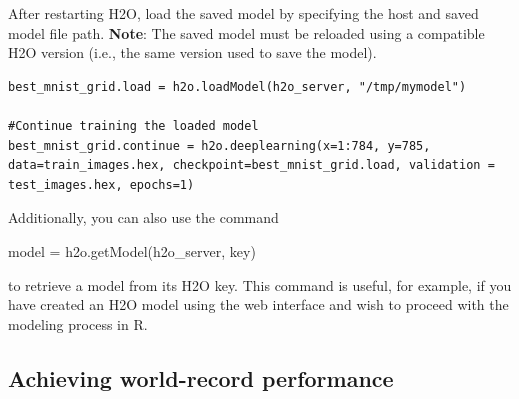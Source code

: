 \documentclass{article}[11pt]
\begin{document}
\noindent
After restarting  H2O, load the saved model by specifying the host and saved model file path. \textbf{Note}: The saved model must be reloaded using a compatible H2O version (i.e., the same version used to save the model).

\begin{lstlisting}[breaklines,basicstyle=\ttfamily]
best_mnist_grid.load = h2o.loadModel(h2o_server, "/tmp/mymodel")

#Continue training the loaded model
best_mnist_grid.continue = h2o.deeplearning(x=1:784, y=785, data=train_images.hex, checkpoint=best_mnist_grid.load, validation = test_images.hex, epochs=1)

\end{lstlisting}
\normalsize

\noindent
Additionally, you can also use the command
\begin{spverbatim}
model = h2o.getModel(h2o_server, key)

\end{spverbatim}
\noindent
to retrieve a model from its H2O key. This command is useful, for example, if you have created an H2O model using the web interface and wish to proceed with the modeling process in R.

\subsection{Achieving world-record performance}
\end{document}
